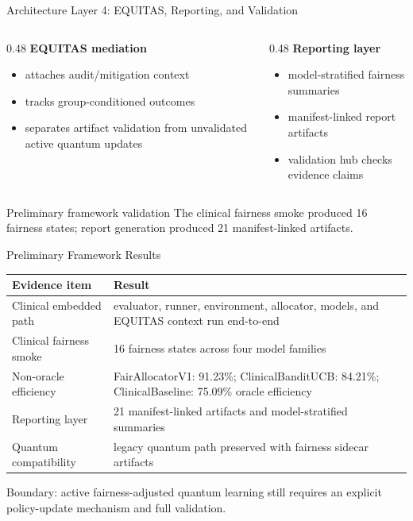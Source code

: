 \documentclass[aspectratio=169,10pt]{beamer}
\begin{document}
\begin{frame}{Architecture Layer 4: EQUITAS, Reporting, and Validation}
\begin{columns}[T]
\begin{column}{0.48\textwidth}
\textbf{EQUITAS mediation}
\begin{itemize}
    \item attaches audit/mitigation context
    \item tracks group-conditioned outcomes
    \item separates artifact validation from unvalidated active quantum updates
\end{itemize}
\end{column}
\begin{column}{0.48\textwidth}
\textbf{Reporting layer}
\begin{itemize}
    \item model-stratified fairness summaries
    \item manifest-linked report artifacts
    \item validation hub checks evidence claims
\end{itemize}
\end{column}
\end{columns}
\begin{block}{Preliminary framework validation}
The clinical fairness smoke produced 16 fairness states; report generation produced 21 manifest-linked artifacts.
\end{block}
\end{frame}

\begin{frame}{Preliminary Framework Results}
\begin{center}
\begin{tabular}{p{}p{}}
\toprule
Evidence item & Result \\
\midrule
Clinical embedded path & evaluator, runner, environment, allocator, models, and EQUITAS context run end-to-end \\
Clinical fairness smoke & 16 fairness states across four model families \\
Non-oracle efficiency & FairAllocatorV1: 91.23\%; ClinicalBanditUCB: 84.21\%; ClinicalBaseline: 75.09\% oracle efficiency \\
Reporting layer & 21 manifest-linked artifacts and model-stratified summaries \\
Quantum compatibility & legacy quantum path preserved with fairness sidecar artifacts \\
\bottomrule
\end{tabular}
\end{center}
\small Boundary: active fairness-adjusted quantum learning still requires an explicit policy-update mechanism and full validation.
\end{frame}
\end{document}
